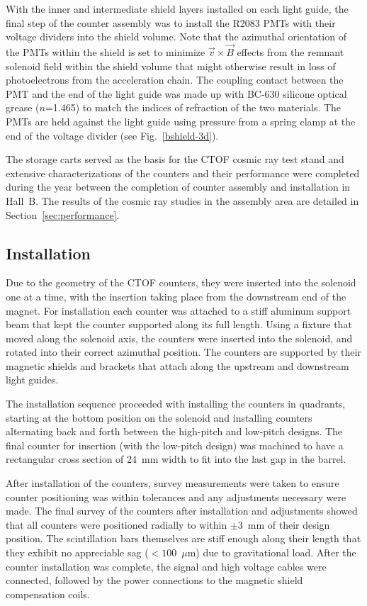 \documentclass[3p,times,twocolumn]{elsarticle}
\begin{document}
With the inner and intermediate shield layers installed on each light guide, the final step of the counter
assembly was to install the R2083 PMTs with their voltage dividers into the shield volume. Note that the
azimuthal orientation of the PMTs within the shield is set to minimize $\vec{v} \times \vec{B}$ effects from
the remnant solenoid field within the shield volume that might otherwise result in loss of photoelectrons from
the acceleration chain. The coupling contact between the PMT and the end of the light guide was made up with
BC-630 silicone optical grease ($n$=1.465) to match the indices of refraction of the two materials. The PMTs
are held against the light guide using pressure from a spring clamp at the end of the voltage divider (see
Fig.~\ref{bshield-3d}).

The storage carts served as the basis for the CTOF cosmic ray test stand and extensive characterizations of
the counters and their performance were completed during the year between the completion of counter
assembly and installation in Hall~B. The results of the cosmic ray studies in the assembly area are detailed in
Section~\ref{sec:performance}.

\subsection{Installation}
\label{installation}

Due to the geometry of the CTOF counters, they were inserted into the solenoid one at a time, with the
insertion taking place from the downstream end of the magnet. For installation each counter was attached
to a stiff aluminum support beam that kept the counter supported along its full length. Using a fixture that
moved along the solenoid axis, the counters were inserted into the solenoid, and rotated into their correct
azimuthal position. The counters are supported by their magnetic shields and brackets that attach along the
upstream and downstream light guides. 

The installation sequence proceeded with installing the counters in quadrants, starting at the bottom position on
the solenoid and installing counters alternating back and forth between the high-pitch and low-pitch designs. The
final counter for insertion (with the low-pitch design) was machined to have a rectangular cross section of 24~mm
width to fit into the last gap in the barrel.

After installation of the counters, survey measurements were taken to ensure counter positioning was within
tolerances and any adjustments necessary were made. The final survey of the counters after installation and
adjustments showed that all counters were positioned radially to within $\pm$3~mm of their design position.
The scintillation bars themselves are stiff enough along their length that they exhibit no appreciable sag
($< 100$~$\mu$m) due to gravitational load. After the counter installation was complete, the signal and
high voltage cables were connected, followed by the power connections to the magnetic shield compensation
coils.
\end{document}
